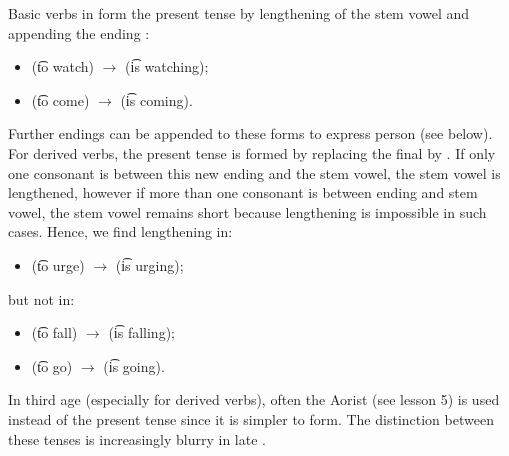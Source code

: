 Basic verbs in \quenya form the present tense by lengthening of the stem vowel
and appending the ending :
\begin{itemize}
  \item {} (\t{to watch}) $\rightarrow$  (\t{is watching});
  \item {} (\t{to come}) $\rightarrow$  (\t{is coming}).
\end{itemize}
Further endings can be appended to these forms to express person (see below).
For derived verbs, the present tense is formed by replacing the final  by
. If only one consonant is between this new ending  and the
stem vowel, the stem vowel is lengthened, however if more than one consonant is between
ending and stem vowel, the stem vowel remains short because lengthening is
impossible in such cases. Hence, we find lengthening in:
\begin{itemize}
  \item {} (\t{to urge}) $\rightarrow$  (\t{is urging});
\end{itemize}
but not in:
\begin{itemize}
  \item {} (\t{to fall}) $\rightarrow$  (\t{is falling});
  \item {} (\t{to go}) $\rightarrow$  (\t{is going}).
\end{itemize}
In third age \quenya (especially for derived verbs),
often the Aorist (see lesson 5) is used instead of the present tense since it is
simpler to form. The distinction between these tenses is increasingly blurry in
late \quenya.

